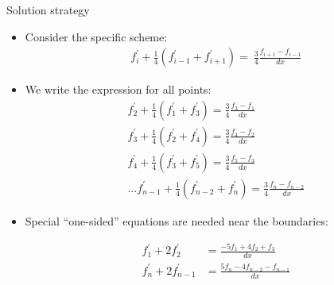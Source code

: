 \begin{frame}
\footnotesize
Solution strategy
\begin{itemize}
\item {Consider the specific scheme:
\begin{align*}
f_i^{\prime} + \frac{1}{4}(f^{\prime}_{i-1} + f^{\prime}_{i+1}) = \
\frac{3}{4}\frac{f_{i+1} - f_{i-1}}{dx}
\end{align*}}

\item {We write the expression for all points:
\begin{align*}
f_2^{\prime} + \frac{1}{4}(f^{\prime}_{1} + f^{\prime}_{3}) =
    \frac{3}{4}\frac{f_{3} - f_{1}}{dx} \\
%
f_3^{\prime} + \frac{1}{4}(f^{\prime}_{2} + f^{\prime}_{4}) =
    \frac{3}{4}\frac{f_{4} - f_{2}}{dx} \\
%
f_4^{\prime} + \frac{1}{4}(f^{\prime}_{3} + f^{\prime}_{5})
    = \frac{3}{4}\frac{f_{5} - f_{3}}{dx} \\
%
\hdots
%
f_{n-1}^{\prime} + \frac{1}{4}(f^{\prime}_{n-2} + f^{\prime}_{n})
    = \frac{3}{4}\frac{f_{n} - f_{n-2}}{dx}
\end{align*}}

\item {Special ``one-sided'' equations are needed near the boundaries:

\begin{align*}
f^{\prime}_1 + 2f^{\prime}_2 &= \frac{-5f_1 + 4f_2 + f_3}{dx} \\
%
f^{\prime}_{n} + 2f^{\prime}_{n-1}
&=
\frac{5f_{n} - 4f_{n-2} -  f_{n-1}}{dx}
\end{align*}}

\end{itemize}
\end{frame}

